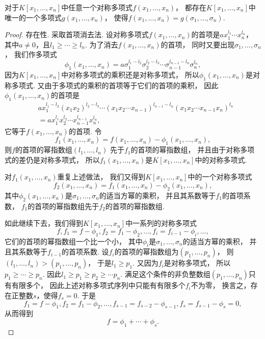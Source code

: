 \begin{theorem}[对称多项式基本定理]
对于\(K[x_1,\dotsc,x_n]\)中任意一个对称多项式\(f(x_1,\dotsc,x_n)\)，
都存在\(K[x_1,\dotsc,x_n]\)中唯一的一个多项式\(g(x_1,\dotsc,x_n)\)，
使得\(f(x_1,\dotsc,x_n)=g(\sigma_1,\dotsc,\sigma_n)\).
\begin{proof}
存在性.
采取首项消去法.
设对称多项式\(f(x_1,\dotsc,x_n)\)的首项是\(a x_1^{l_1} \dotsm x_n^{l_n}\)，
其中\(a\neq0\)，且\(l_1 \geq \dotsb \geq l_n\).
为了消去\(f(x_1,\dotsc,x_n)\)的首项，
同时又要出现\(\sigma_1,\dotsc,\sigma_n\)，
我们作多项式\[
	\phi_1(x_1,\dotsc,x_n)
	= a \sigma_1^{l_1-l_2} \sigma_2^{l_2-l_3}
	\dotsm \sigma_{n-1}^{l_{n-1}-l_n} \sigma_n^{l_n},
\]
因为\(K[x_1,\dotsc,x_n]\)中对称多项式的乘积还是对称多项式，
所以\(\phi_1(x_1,\dotsc,x_n)\)是对称多项式.
又由于多项式的乘积的首项等于它们的首项的乘积，
因此\(\phi_1(x_1,\dotsc,x_n)\)的首项是\begin{align*}
	&a x_1^{l_1-l_2} (x_1 x_2)^{l_2-l_3}
	\dotsm (x_1 x_2 \dotsm x_{n-1})^{l_{n-1}-l_n}
	(x_1 x_2 \dotsm x_{n-1} x_n)^{l_n} \\
	&= a x_1^{l_1} x_2^{l_2} \dotsm x_{n-1}^{l_{n-1}} x_n^{l_n},
\end{align*}
它等于\(f(x_1,\dotsc,x_n)\)的首项.
令\[
	f_1(x_1,\dotsc,x_n)
	=f(x_1,\dotsc,x_n)
	-\phi_1(x_1,\dotsc,x_n),
\]
则\(f\)的首项的幂指数组\((l_1,\dotsc,l_n)\)
先于\(f_1\)的首项的幂指数组，
并且由于对称多项式的差仍是对称多项式，
所以\(f_1(x_1,\dotsc,x_n)\)是\(K[x_1,\dotsc,x_n]\)中的对称多项式.

对\(f_1(x_1,\dotsc,x_n)\)重复上述做法，
我们又得到\(K[x_1,\dotsc,x_n]\)中的一个对称多项式\[
	f_2(x_1,\dotsc,x_n)
	=f_1(x_1,\dotsc,x_n)
	-\phi_2(x_1,\dotsc,x_n),
\]
其中\(\phi_2(x_1,\dotsc,x_n)\)是\(\sigma_1,\dotsc,\sigma_n\)的适当方幂的乘积，
并且其系数等于\(f_1\)的首项系数，
\(f_1\)的首项的幂指数组先于\(f_2\)的首项的幂指数组.

如此继续下去，我们得到\(K[x_1,\dotsc,x_n]\)中一系列的对称多项式\[
	f,
	f_1=f-\phi_1,
	f_2=f_1-\phi_2,
	\dotsc,
	f_i=f_{i-1}-\phi_i,
	\dotsc,
\]
它们的首项的幂指数组一个比一个小，
其中\(\phi_i\)是\(\sigma_1,\dotsc,\sigma_n\)的适当方幂的乘积，
并且其系数等于\(f_{i-1}\)的首项系数.
设\(f_i\)的首项的幂指数组为\((p_1,\dotsc,p_n)\)，
则\((l_1,\dotsc,l_n)>(p_1,\dotsc,p_n)\)，
于是\(l_1 \geq p_1\).
又因为\(f_i\)是对称多项式，
所以\(p_1 \geq \dotsb \geq p_n\).
因此\(l_1 \geq p_1 \geq p_2 \geq \dotsb p_n\).
满足这个条件的非负整数组\((p_1,\dotsc,p_n)\)只有有限多个，
因此上述对称多项式序列中只能有有限多个\(f_i\)不为零，
换言之，存在正整数\(s\)，使得\(f_s=0\).
于是\[
	f_1=f-\phi_1,
	f_2=f_1-\phi_2,
	\dotsc,
	f_{s-1}=f_{s-2}-\phi_{s-1},
	f_s=f_{s-1}-\phi_s=0,
\]
从而得到\[
	f=\phi_1+\dotsb+\phi_s.
\]


\end{proof}
\end{theorem}
